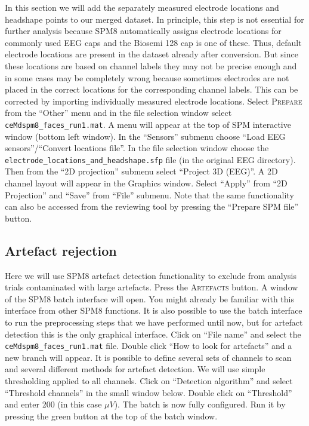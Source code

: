 In this section we will add the separately measured electrode locations and headshape points to our merged dataset. In principle, this step is not essential for further analysis because SPM8 automatically assigns electrode locations for commonly used EEG caps and the Biosemi 128 cap is one of these. Thus, default electrode locations are present in the dataset already after conversion. But since these locations are based on channel labels they may not be precise enough and in some cases may be completely wrong because sometimes electrodes are not placed in the correct locations for the corresponding channel labels. This can be corrected by importing individually measured electrode locations. Select \textsc{Prepare} from the ``Other'' menu and in the file selection window select \texttt{ceMdspm8\_faces\_run1.mat}. A menu will appear at the top of SPM interactive window (bottom left window). In the ``Sensors'' submenu choose ``Load EEG sensors''/``Convert locations file''. In the file selection window choose the \texttt{electrode\_locations\_and\_headshape.sfp} file (in the original EEG directory). Then from the ``2D projection'' submenu select ``Project 3D (EEG)''. A 2D channel layout will appear in the Graphics window. Select ``Apply'' from ``2D Projection'' and ``Save'' from ``File'' submenu. Note that the same functionality can also be accessed from the reviewing tool by pressing the ``Prepare SPM file'' button.

\subsection{Artefact rejection}

Here we will use SPM8 artefact detection functionality to exclude from analysis trials contaminated with large artefacts. Press the \textsc{Artefacts} button. A window of the SPM8 batch interface will open. You might already be familiar with this interface from other SPM8 functions. It is also possible to use the batch interface to run the preprocessing steps that we have performed until now, but for artefact detection this is the only graphical interface. Click on ``File name'' and select the \texttt{ceMdspm8\_faces\_run1.mat} file.  Double click ``How to look for artefacts'' and a new branch will appear. It is possible to define several sets of channels to scan and several different methods for artefact detection. We will use simple thresholding applied to all channels. Click on ``Detection algorithm'' and select ``Threshold channels'' in the small window below. Double click on ``Threshold'' and enter 200 (in this case $\mu V$). The batch is now fully configured. Run it by pressing the green button at the top of the batch window.

